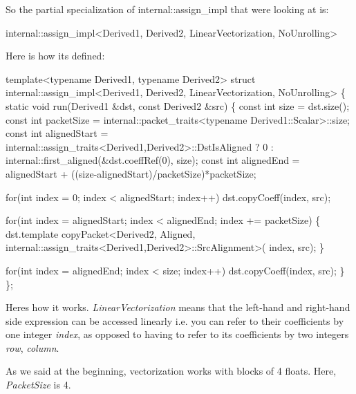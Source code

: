 So the partial specialization of internal\+::assign\+\_\+impl that we\textquotesingle{}re looking at is\+: 
\begin{DoxyCode}
internal::assign\_impl<Derived1, Derived2, LinearVectorization, NoUnrolling>
\end{DoxyCode}


Here is how it\textquotesingle{}s defined\+: 
\begin{DoxyCode}
\textcolor{keyword}{template}<\textcolor{keyword}{typename} Derived1, \textcolor{keyword}{typename} Derived2>
\textcolor{keyword}{struct }internal::assign\_impl<Derived1, Derived2, LinearVectorization, NoUnrolling>
\{
  \textcolor{keyword}{static} \textcolor{keywordtype}{void} run(Derived1 &dst, \textcolor{keyword}{const} Derived2 &src)
  \{
    \textcolor{keyword}{const} \textcolor{keywordtype}{int} size = dst.size();
    \textcolor{keyword}{const} \textcolor{keywordtype}{int} packetSize = internal::packet\_traits<typename Derived1::Scalar>::size;
    \textcolor{keyword}{const} \textcolor{keywordtype}{int} alignedStart = internal::assign\_traits<Derived1,Derived2>::DstIsAligned ? 0
                           : internal::first\_aligned(&dst.coeffRef(0), size);
    \textcolor{keyword}{const} \textcolor{keywordtype}{int} alignedEnd = alignedStart + ((size-alignedStart)/packetSize)*packetSize;

    \textcolor{keywordflow}{for}(\textcolor{keywordtype}{int} index = 0; index < alignedStart; index++)
      dst.copyCoeff(index, src);

    \textcolor{keywordflow}{for}(\textcolor{keywordtype}{int} index = alignedStart; index < alignedEnd; index += packetSize)
    \{
      dst.template copyPacket<Derived2, Aligned, internal::assign\_traits<Derived1,Derived2>::SrcAlignment>(
      index, src);
    \}

    \textcolor{keywordflow}{for}(\textcolor{keywordtype}{int} index = alignedEnd; index < size; index++)
      dst.copyCoeff(index, src);
  \}
\};
\end{DoxyCode}


Here\textquotesingle{}s how it works. {\itshape Linear\+Vectorization} means that the left-\/hand and right-\/hand side expression can be accessed linearly i.\+e. you can refer to their coefficients by one integer {\itshape index}, as opposed to having to refer to its coefficients by two integers {\itshape row}, {\itshape column}.

As we said at the beginning, vectorization works with blocks of 4 floats. Here, {\itshape Packet\+Size} is 4.

